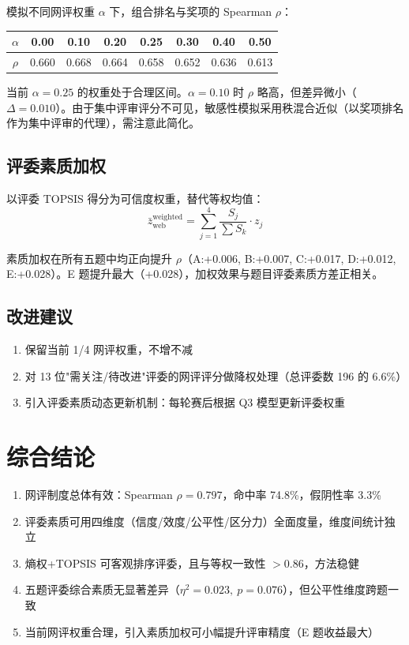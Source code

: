 \documentclass[UTF8]{ctexart}
\begin{document}
模拟不同网评权重 $\alpha$ 下，组合排名与奖项的 Spearman $\rho$：

\begin{center}
\begin{tabular}{cccccccc}
\toprule
$\alpha$ & 0.00 & 0.10 & 0.20 & 0.25 & 0.30 & 0.40 & 0.50 \\
\midrule
$\rho$ & 0.660 & 0.668 & 0.664 & 0.658 & 0.652 & 0.636 & 0.613 \\
\bottomrule
\end{tabular}
\end{center}

当前 $\alpha=0.25$ 的权重处于合理区间。$\alpha=0.10$ 时 $\rho$ 略高，但差异微小（$\Delta = 0.010$）。由于集中评审评分不可见，敏感性模拟采用秩混合近似（以奖项排名作为集中评审的代理），需注意此简化。

\subsection{评委素质加权}

以评委 TOPSIS 得分为可信度权重，替代等权均值：
\begin{equation}
\bar{z}_{\text{web}}^{\text{weighted}} = \sum_{j=1}^{4} \frac{S_j}{\sum S_k} \cdot z_j
\end{equation}

素质加权在所有五题中均正向提升 $\rho$（A:+0.006, B:+0.007, C:+0.017, D:+0.012, E:+0.028）。E 题提升最大（+0.028），加权效果与题目评委素质方差正相关。

\subsection{改进建议}

\begin{enumerate}
    \item 保留当前 1/4 网评权重，不增不减
    \item 对 13 位"需关注/待改进"评委的网评评分做降权处理（总评委数 196 的 6.6\%）
    \item 引入评委素质动态更新机制：每轮赛后根据 Q3 模型更新评委权重
\end{enumerate}

\section{综合结论}

\begin{enumerate}
    \item 网评制度总体有效：Spearman $\rho=0.797$，命中率 74.8\%，假阴性率 3.3\%
    \item 评委素质可用四维度（信度/效度/公平性/区分力）全面度量，维度间统计独立
    \item 熵权+TOPSIS 可客观排序评委，且与等权一致性 $>0.86$，方法稳健
    \item 五题评委综合素质无显著差异（$\eta^2=0.023,\ p=0.076$），但公平性维度跨题一致
    \item 当前网评权重合理，引入素质加权可小幅提升评审精度（E 题收益最大）
\end{enumerate}
\end{document}
